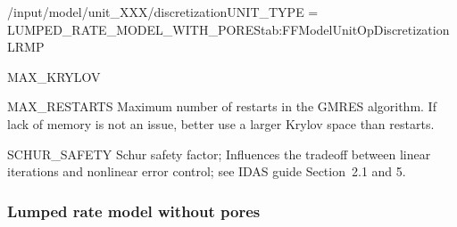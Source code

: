 \begin{condsubgroup}{/input/model/unit\_XXX/discretization}{UNIT\_TYPE = LUMPED\_RATE\_MODEL\_WITH\_PORES}{tab:FFModelUnitOpDiscretizationLRMP}
\begin{dataset}[type=int,range={$\{0, \dots, \texttt{NCOL} \cdot \texttt{NCOMP} \cdot \texttt{NPARTYPE} \}$},length=1]{MAX\_KRYLOV}
  \end{dataset}
  \begin{dataset}[type=int,range={$\geq 0$},length=1]{MAX\_RESTARTS}
    Maximum number of restarts in the GMRES algorithm. If lack of memory is not an issue, better use a larger Krylov space than restarts.
  \end{dataset}
  \begin{dataset}[type=double,range={$\geq 0$},length=1]{SCHUR\_SAFETY}
    Schur safety factor; Influences the tradeoff between linear iterations and nonlinear error control; see IDAS guide Section~2.1 and 5.
  \end{dataset}
\end{condsubgroup}

\subsubsection{Lumped rate model without pores}

